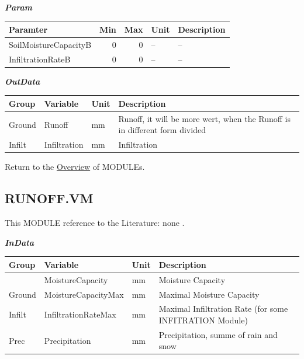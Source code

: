 \documentclass[
]{book}
\begin{document}
\textbf{\emph{Param}}

\begin{table}[!h]
\centering
\begin{tabular}{l|r|r|l|l}
\hline
Paramter & Min & Max & Unit & Description\\
\hline
SoilMoistureCapacityB & 0 & 0 & -- & --\\
\cline{1-5}
InfiltrationRateB & 0 & 0 & -- & --\\
\hline
\end{tabular}
\end{table}

\textbf{\emph{OutData}}

\begin{table}[!h]
\centering
\begin{tabular}{l|l|l|l}
\hline
Group & Variable & Unit & Description\\
\hline
Ground & Runoff & mm & Runoff, it will be more wert, when the Runoff is in different form divided\\
\cline{1-4}
Infilt & Infiltration & mm & Infiltration\\
\hline
\end{tabular}
\end{table}

Return to the \protect\hyperlink{module}{Overview} of MODULEs.

\hypertarget{RUNOFF.VM}{%
\subsection{RUNOFF.VM}\label{RUNOFF.VM}}

This MODULE reference to the Literature: none \citep{none}.

\textbf{\emph{InData}}

\begin{table}[!h]
\centering
\begin{tabular}{l|l|l|l}
\hline
Group & Variable & Unit & Description\\
\hline
 & MoistureCapacity & mm & Moisture Capacity\\
\cline{2-4}
\multirow{-2}{*}{\raggedright\arraybackslash Ground} & MoistureCapacityMax & mm & Maximal Moisture Capacity\\
\cline{1-4}
Infilt & InfiltrationRateMax & mm & Maximal Infiltration Rate (for some INFITRATION Module)\\
\cline{1-4}
Prec & Precipitation & mm & Precipitation, summe of rain and snow\\
\hline
\end{tabular}
\end{table}
\end{document}
